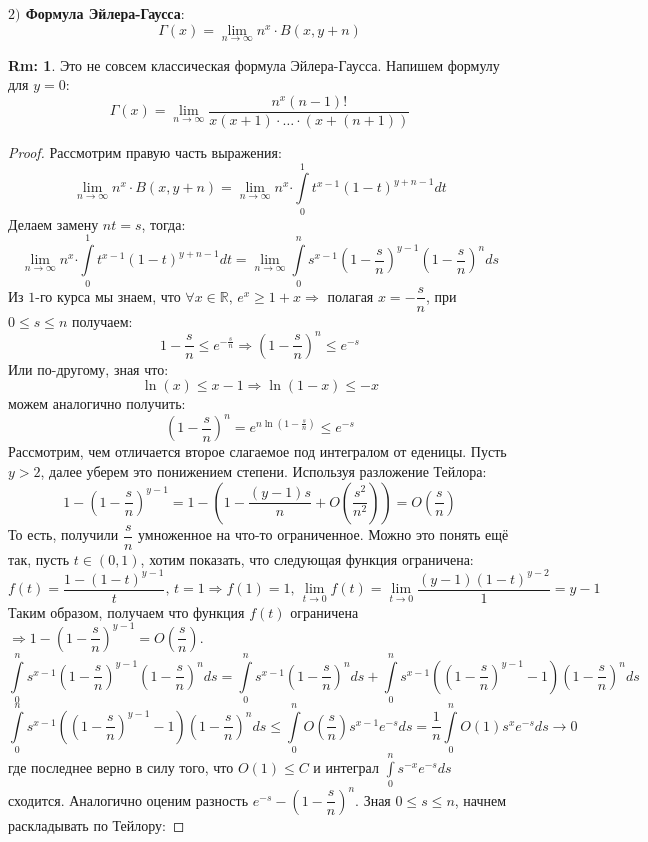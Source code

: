 \documentclass[12pt]{article}
\newcommand{\MR}{\mathbb{R}}
\theoremstyle{definition}
\newtheorem{rem}{Rm:}
\newcommand{\ddint}[2]{\displaystyle\int\limits_{#1}^{#2}}
\begin{document}
\textbf{$2)$ Формула Эйлера-Гаусса}: 
$$
	\Gamma(x) = \lim\limits_{n \to \infty}n^x{\cdot}B(x,y+n)
$$
\begin{rem}
	Это не совсем классическая формула Эйлера-Гаусса. Напишем формулу для $y = 0$:
	$$
		\Gamma(x) = \lim\limits_{n \to \infty}\dfrac{n^x(n-1)!}{x(x + 1){\cdot}\dotsc{\cdot}(x + (n+1))}
	$$
\end{rem}
\begin{proof}
	Рассмотрим правую часть выражения:
	$$
		\lim\limits_{n \to \infty}n^x{\cdot}B(x,y+n) = 	\lim\limits_{n \to \infty} n^x{\cdot\!}\ddint{0}{1}t^{x-1}(1-t)^{y+n - 1}dt
	$$
	Делаем замену $nt = s$, тогда:
	$$
		\lim\limits_{n \to \infty} n^x{\cdot\!}\ddint{0}{1}t^{x-1}(1-t)^{y+n - 1}dt = \lim\limits_{n \to \infty}\ddint{0}{n}s^{x-1}\left(1 - \dfrac{s}{n}\right)^{y - 1}\left(1 - \dfrac{s}{n}\right)^nds
	$$
	Из $1$-го курса мы знаем, что $\forall x \in \MR, \, e^x \geq 1 + x \Rightarrow$ полагая $x = -\dfrac{s}{n}$, при $0 \leq s \leq n$ получаем:
	$$
		1 - \dfrac{s}{n} \leq e^{-\tfrac{s}{n}} \Rightarrow 	\left(1 - \dfrac{s}{n}\right)^n \leq e^{-s}
	$$
	Или по-другому, зная что:
	$$
		\ln{(x)} \leq x - 1 \Rightarrow \ln{(1 -x)} \leq  - x
	$$ 
	можем аналогично получить:
	$$
		\left(1 - \dfrac{s}{n}\right)^n = e^{n \ln{\left(1- \tfrac{s}{n}\right)}} \leq e^{-s}
	$$
	Рассмотрим, чем отличается второе слагаемое под интегралом от еденицы. Пусть $y > 2$, далее уберем это понижением степени. Используя разложение Тейлора:
	$$
		1 - \left(1 - \dfrac{s}{n}\right)^{y-1} = 1 - \left(1 - \dfrac{(y-1)s}{n} + O\left(\dfrac{s^2}{n^2}\right) \right) = O\left(\dfrac{s}{n}\right)
	$$
	То есть, получили $\dfrac{s}{n}$ умноженное на что-то ограниченное. Можно это понять ещё так, пусть $t \in (0,1)$, хотим показать, что следующая функция ограничена:
	$$
		f(t) = \dfrac{1 - (1 -t)^{y-1}}{t}, \, t = 1 \Rightarrow f(1) = 1, \, \lim\limits_{t \to 0}f(t) = \lim\limits_{t \to 0}\dfrac{(y-1)(1-t)^{y-2}}{1} = y-1
	$$
	Таким образом, получаем что функция $f(t)$ ограничена $\Rightarrow 1 - \left(1 - \dfrac{s}{n}\right)^{y-1} = O\left(\dfrac{s}{n}\right)$.
	$$
		\ddint{0}{n}s^{x-1}\left(1 - \dfrac{s}{n}\right)^{y - 1}\left(1 - \dfrac{s}{n}\right)^nds = \ddint{0}{n}s^{x-1}\left(1 - \dfrac{s}{n}\right)^nds + \ddint{0}{n}s^{x-1}\left(\left(1 - \dfrac{s}{n}\right)^{y-1} - 1 \right)\left(1 - \dfrac{s}{n}\right)^nds
	$$
	$$
		\ddint{0}{n}s^{x-1}\left(\left(1 - \dfrac{s}{n}\right)^{y-1} - 1 \right)\left(1 - \dfrac{s}{n}\right)^nds \leq \ddint{0}{n}O\left(\dfrac{s}{n}\right)s^{x-1}e^{-s}ds = \dfrac{1}{n}\ddint{0}{n}O(1)s^x e^{-s}ds \to 0
	$$
	где последнее верно в силу того, что $O(1) \leq C$ и интеграл $\ddint{0}{n}s^{-x}e^{-s}ds$ сходится. Аналогично оценим разность $e^{-s} - \left(1 - \dfrac{s}{n}\right)^n$. Зная $0 \leq s \leq n$, начнем раскладывать по Тейлору:

\end{proof}
\end{document}
